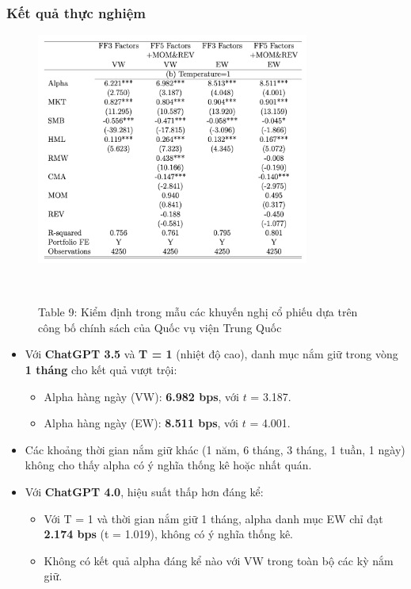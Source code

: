 \documentclass[a4paper,12pt]{article}
\begin{document}
\subsubsection{Kết quả thực nghiệm}
\begin{figure}[H]
    \centering
    \includegraphics[width=0.8\textwidth]{table/tab9b.png}
    \caption*{Table 9: Kiểm định trong mẫu các khuyến nghị cổ phiếu dựa trên công bố chính sách của Quốc vụ viện Trung Quốc}
    \
\end{figure}
\begin{itemize}
    \item Với \textbf{ChatGPT 3.5} và \textbf{T = 1} (nhiệt độ cao), danh mục nắm giữ trong vòng \textbf{1 tháng} cho kết quả vượt trội:
    \begin{itemize}
        \item Alpha hàng ngày (VW): \textbf{6.982 bps}, với $t$ = 3.187.
        \item Alpha hàng ngày (EW): \textbf{8.511 bps}, với $t$ = 4.001.
    \end{itemize}
    \item Các khoảng thời gian nắm giữ khác (1 năm, 6 tháng, 3 tháng, 1 tuần, 1 ngày) không cho thấy alpha có ý nghĩa thống kê hoặc nhất quán.
    \item Với \textbf{ChatGPT 4.0}, hiệu suất thấp hơn đáng kể:
    \begin{itemize}
        \item Với T = 1 và thời gian nắm giữ 1 tháng, alpha danh mục EW chỉ đạt \textbf{2.174 bps} (t = 1.019), không có ý nghĩa thống kê.
        \item Không có kết quả alpha đáng kể nào với VW trong toàn bộ các kỳ nắm giữ.
    \end{itemize}
\end{itemize}
\end{document}
